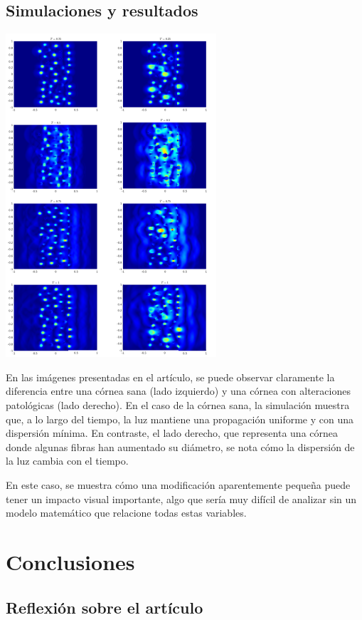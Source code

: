 \documentclass[10pt,a4paper]{article}
\begin{document}
\subsection{Simulaciones y resultados}
\begin{center}
	\includegraphics[scale=1]{resultados-corneas.png} 
\end{center}
En las imágenes presentadas en el artículo, se puede observar claramente la diferencia entre una córnea sana (lado izquierdo) y una córnea con alteraciones patológicas (lado derecho). En el caso de la córnea sana, la simulación muestra que, a lo largo del tiempo, la luz mantiene una propagación uniforme y con una dispersión mínima. En contraste, el lado derecho, que representa una córnea donde algunas fibras han aumentado su diámetro, se nota cómo la dispersión de la luz cambia con el tiempo.
 
En este caso, se muestra cómo una modificación aparentemente pequeña puede tener un impacto visual importante, algo que sería muy difícil de analizar sin un modelo matemático que relacione todas estas variables.

\newpage

\section{Conclusiones}

\subsection{Reflexión sobre el artículo}
\end{document}
